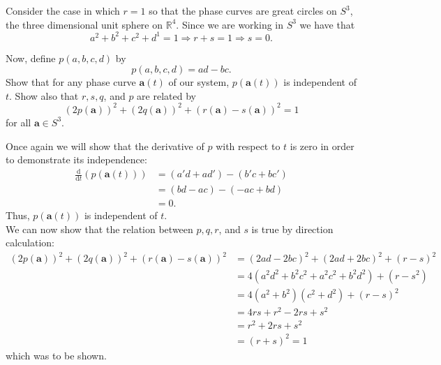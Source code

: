 \documentclass{exam}
\newcommand{\RR}{\mathbb R}
\begin{document}
\begin{questions}
    Consider the case in which $r = 1$ so that the phase curves are great circles on $S^3$, the three dimensional unit sphere on $\RR^4$. Since we are working in $S^3$ we have that 
    \[
        a^2 + b^2 + c^2 + d^1 = 1 \Rightarrow r + s = 1 \Rightarrow s = 0.
    \]

    \question Now, define $p(a, b, c, d)$ by 
    \[
        p(a, b, c, d) = ad - bc.
    \]
    Show that for any phase curve $\mathbf{a}(t)$ of our system, $p(\mathbf{a}(t))$ is independent of $t$. Show also that $r, s, q$, and $p$ are related by 
    \[
        (2p(\mathbf{a}))^2 + (2q(\mathbf{a}))^2 + (r(\mathbf{a}) - s(\mathbf{a}))^2 = 1 
    \]
    for all $\mathbf{a} \in S^3$.
    \begin{solution}
        Once again we will show that the derivative of $p$ with respect to $t$ is zero in order to demonstrate its independence: 
        \begin{align*}
            \frac{\mathrm{d}}{\mathrm{d}t}(p(\mathbf{a}(t))) &= (a'd + ad') - (b'c + bc') \\
            &= (bd - ac) - (-ac + bd) \\
            &= 0.
        \end{align*}
        Thus, $p(\mathbf{a}(t))$ is independent of $t$. \\
        We can now show that the relation between $p, q, r$, and $s$ is true by direction calculation:
        \begin{align*}
        (2p(\mathbf{a}))^2 + (2q(\mathbf{a}))^2 + (r(\mathbf{a}) - s(\mathbf{a}))^2 &= (2ad - 2bc)^2 + (2ad + 2bc)^2 + (r - s)^2 \\
        &= 4(a^2 d^2 + b^2 c^2 + a^2 c^2 + b^2 d^2) + (r - s ^2) \\
        &= 4(a^2 + b^2)(c^2 + d^2) + (r - s)^2 \\
        &= 4rs + r^2 - 2rs + s^2 \\
        &= r^2 + 2rs + s^2 \\
        &= (r + s)^2 = 1
        \end{align*}
        which was to be shown.
    \end{solution}
\end{questions}
\end{document}
